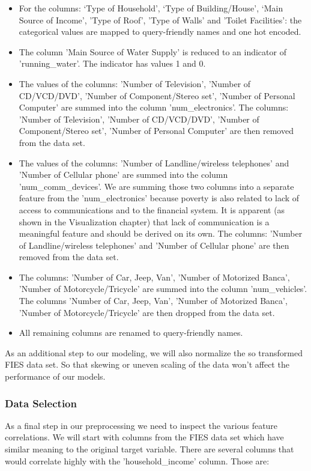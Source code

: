 \documentclass{article}
\begin{document}
\begin{itemize}
  \item For the columns: ‘Type of Household’, ‘Type of Building/House’, ‘Main Source of Income’, 'Type of Roof', 'Type of Walls' and 'Toilet Facilities': the categorical values are mapped to query-friendly names and one hot encoded.
  \item The column 'Main Source of Water Supply' is reduced to an indicator of 'running\_water'. The indicator has values 1 and 0.
  \item The values of the columns: 'Number of Television', 'Number of CD/VCD/DVD', 'Number of Component/Stereo set', 'Number of Personal Computer' are summed into the column 'num\_electronics'. The columns: 'Number of Television', 'Number of CD/VCD/DVD', 'Number of Component/Stereo set', 'Number of Personal Computer' are then removed from the data set.
  \item The values of the columns: 'Number of Landline/wireless telephones' and  'Number of Cellular phone' are summed into the column 'num\_comm\_devices'. We are summing those two columns into a separate feature from the 'num\_electronics' because poverty is also related to lack of access to communications and to the financial system. It is apparent (as shown in the Visualization chapter) that lack of communication is a meaningful feature and should be derived on its own. The columns:  'Number of Landline/wireless telephones' and  'Number of Cellular phone' are then removed from the data set.
  \item The columns: 'Number of Car, Jeep, Van', 'Number of Motorized Banca', 'Number of Motorcycle/Tricycle' are summed into the column 'num\_vehicles'. The columns 'Number of Car, Jeep, Van', 'Number of Motorized Banca', 'Number of Motorcycle/Tricycle' are then dropped from the data set.
  \item All remaining columns are renamed to query-friendly names.
\end{itemize}

As an additional step to our modeling, we will also normalize the so transformed FIES data set. So that skewing or uneven scaling of the data won’t affect the performance of our models.

\subsubsection{Data Selection}
As a final step in our preprocessing we need to inspect the various feature correlations. We will start with columns from the FIES data set which have similar meaning to the original target variable. There are several columns that would correlate highly with the 'household\_income' column. Those are:
\end{document}
